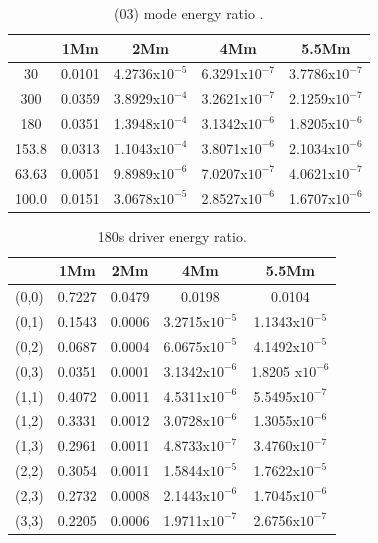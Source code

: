 \documentclass[final,1p]{elsarticle}
\begin{document}
\begin{table}
\centering
\begin{tabular}{c c c c c }
\hline
   &  1Mm & 2Mm & 4Mm & 5.5Mm \\
\hline
30 &  0.0101 &  4.2736x$10^{-5}$ & 6.3291x$10^{-7}$ & 3.7786x$10^{-7}$\\
\hline
300 & 0.0359 & 3.8929x$10^{-4}$ & 3.2621x$10^{-7}$ & 2.1259x$10^{-7}$\\
\hline
180 & 0.0351 &1.3948x$10^{-4}$ & 3.1342x$10^{-6}$ & 1.8205x$10^{-6}$\\
\hline
153.8 & 0.0313 & 1.1043x$10^{-4}$ & 3.8071x$10^{-6}$ & 2.1034x$10^{-6}$\\
\hline
63.63 & 0.0051 & 9.8989x$10^{-6}$ & 7.0207x$10^{-7}$ & 4.0621x$10^{-7}$\\
\hline
100.0 & 0.0151 & 3.0678x$10^{-5}$ & 2.8527x$10^{-6}$ & 1.6707x$10^{-6}$\\
\hline
\end{tabular} 
\caption{ (03) mode energy ratio .}
\end{table}





\begin{table}
\centering
\begin{tabular}{c c c c c }
\hline
   &  1Mm & 2Mm & 4Mm & 5.5Mm \\
\hline
(0,0) &  0.7227 & 0.0479 & 0.0198 & 0.0104 \\
\hline
(0,1) & 0.1543 & 0.0006 & 3.2715x$10^{-5}$ &  1.1343x$10^{-5}$\\
\hline
(0,2) & 0.0687 & 0.0004 & 6.0675x$10^{-5}$ &  4.1492x$10^{-5}$\\
\hline
(0,3) & 0.0351 & 0.0001 & 3.1342x$10^{-6}$ & 1.8205 x$10^{-6}$\\
\hline
(1,1) & 0.4072 & 0.0011 & 4.5311x$10^{-6}$ &  5.5495x$10^{-7}$\\
\hline
(1,2) & 0.3331 & 0.0012 & 3.0728x$10^{-6}$ &  1.3055x$10^{-6}$\\
\hline
(1,3) & 0.2961 & 0.0011 & 4.8733x$10^{-7}$ &  3.4760x$10^{-7}$\\
\hline
(2,2) & 0.3054 & 0.0011 & 1.5844x$10^{-5}$ &  1.7622x$10^{-5}$\\
\hline
(2,3) & 0.2732 & 0.0008 & 2.1443x$10^{-6}$ &  1.7045x$10^{-6}$\\
\hline
(3,3) & 0.2205 & 0.0006 & 1.9711x$10^{-7}$ &  2.6756x$10^{-7}$\\
\hline
\end{tabular} 
\caption{ 180s driver energy ratio. }
\end{table}
\end{document}

